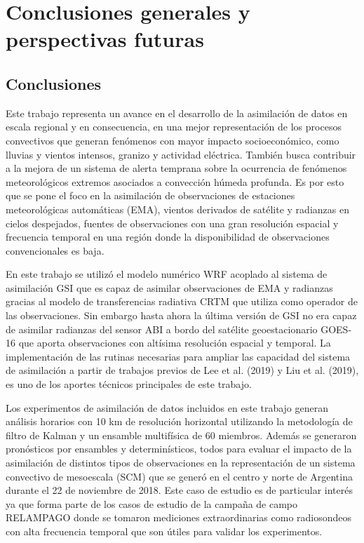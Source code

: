 \documentclass[12pt,oneside,a4paper]{reedthesis}
\begin{document}
\hypertarget{conclusiones-generales-y-perspectivas-futuras}{%
\chapter{Conclusiones generales y perspectivas futuras}\label{conclusiones-generales-y-perspectivas-futuras}}

\hypertarget{conclusiones-3}{%
\section{Conclusiones}\label{conclusiones-3}}

Este trabajo representa un avance en el desarrollo de la asimilación de datos en escala regional y en consecuencia, en una mejor representación de los procesos convectivos que generan fenómenos con mayor impacto socioeconómico, como lluvias y vientos intensos, granizo y actividad eléctrica. También busca contribuir a la mejora de un sistema de alerta temprana sobre la ocurrencia de fenómenos meteorológicos extremos asociados a convección húmeda profunda. Es por esto que se pone el foco en la asimilación de observaciones de estaciones meteorológicas automáticas (EMA), vientos derivados de satélite y radianzas en cielos despejados, fuentes de observaciones con una gran resolución espacial y frecuencia temporal en una región donde la disponibilidad de observaciones convencionales es baja.

En este trabajo se utilizó el modelo numérico WRF acoplado al sistema de asimilación GSI que es capaz de asimilar observaciones de EMA y radianzas gracias al modelo de transferencias radiativa CRTM que utiliza como operador de las observaciones. Sin embargo hasta ahora la última versión de GSI no era capaz de asimilar radianzas del sensor ABI a bordo del satélite geoestacionario GOES-16 que aporta observaciones con altísima resolución espacial y temporal. La implementación de las rutinas necesarias para ampliar las capacidad del sistema de asimilación a partir de trabajos previos de Lee et al. (2019) y Liu et al. (2019), es uno de los aportes técnicos principales de este trabajo.

Los experimentos de asimilación de datos incluidos en este trabajo generan análisis horarios con 10 km de resolución horizontal utilizando la metodología de filtro de Kalman y un ensamble multifísica de 60 miembros. Además se generaron pronósticos por ensambles y determinísticos, todos para evaluar el impacto de la asimilación de distintos tipos de observaciones en la representación de un sistema convectivo de mesoescala (SCM) que se generó en el centro y norte de Argentina durante el 22 de noviembre de 2018. Este caso de estudio es de particular interés ya que forma parte de los casos de estudio de la campaña de campo RELAMPAGO donde se tomaron mediciones extraordinarias como radiosondeos con alta frecuencia temporal que son útiles para validar los experimentos.
\end{document}
